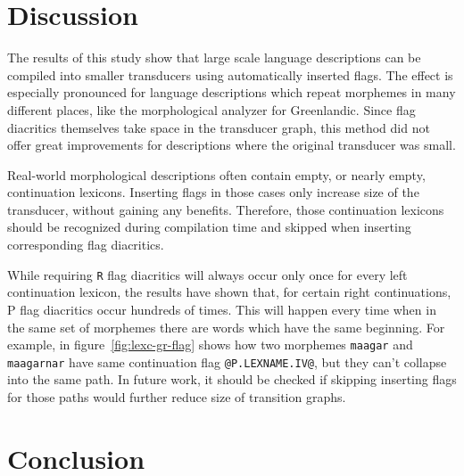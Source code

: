 \documentclass[11pt]{article}
\begin{document}
\section{Discussion}
\label{sec:discussion}

The results of this study show that large scale language descriptions
can be compiled into smaller transducers using automatically inserted
flags. The effect is especially pronounced for language descriptions
which repeat morphemes in many different places, like the
morphological analyzer for Greenlandic. Since flag diacritics
themselves take space in the transducer graph, this method did not
offer great improvements for descriptions where the original
transducer was small.

Real-world morphological descriptions often contain empty, or nearly
empty, continuation lexicons. Inserting flags in those cases only
increase size of the transducer, without gaining any
benefits. Therefore, those continuation lexicons should be recognized
during compilation time and skipped when inserting corresponding flag
diacritics.

While requiring {\tt R} flag diacritics will always occur only once
for every left continuation lexicon, the results have shown that, for
certain right continuations, P flag diacritics occur hundreds of
times. This will happen every time when in the same set of morphemes
there are words which have the same beginning. For example, in
figure~\ref{fig:lexc-gr-flag} shows how two morphemes \texttt{maagar}
and \texttt{maagarnar} have same continuation flag
\verb+@P.LEXNAME.IV@+, but they can't collapse into the same path. In future
work, it should be checked if skipping inserting flags for those paths would
further reduce size of transition graphs.






\section{Conclusion}
\label{sec:conclusion}
\end{document}
